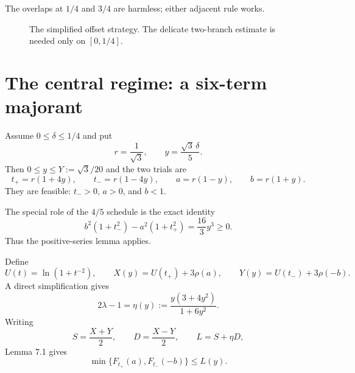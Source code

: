 \documentclass[11pt]{article}
\theoremstyle{definition}
\newcommand{\1}{\mathbf{1}}
\begin{document}
The overlaps at $1/4$ and $3/4$ are harmless; either adjacent rule works.

\begin{figure}[t]
\centering
{}
\caption{The simplified offset strategy.  The delicate two-branch estimate is needed only on $[0,1/4]$.}
\label{fig:regimes}
\end{figure}

\section{The central regime: a six-term majorant}

Assume $0\le\delta\le1/4$ and put
\begin{equation}
r=\frac1{\sqrt3},
\qquad
y=\frac{\sqrt3\,\delta}{5}.
\label{eq:y-def}
\end{equation}
Then $0\le y\le Y:=\sqrt3/20$ and the two trials are
\begin{equation}
 t_+=r(1+4y),\qquad t_-=r(1-4y),
\qquad a=r(1-y),\qquad b=r(1+y).
\label{eq:four-fifths}
\end{equation}
They are feasible: $t_->0$, $a>0$, and $b<1$.

The special role of the $4/5$ schedule is the exact identity
\begin{equation}
b^2(1+t_-^2)-a^2(1+t_+^2)=\frac{16}{3}y^3\ge0.
\label{eq:magic-cubic}
\end{equation}
Thus the positive-series lemma applies.

Define
\[
U(t)=\ln(1+t^{-2}),
\qquad
X(y)=U(t_+)+3\rho(a),
\qquad
Y(y)=U(t_-)+3\rho(-b).
\]
A direct simplification gives
\begin{equation}
2\lambda-1=\eta(y):=\frac{y(3+4y^2)}{1+6y^2}.
\label{eq:eta}
\end{equation}
Writing
\[
S=\frac{X+Y}{2},
\qquad
D=\frac{X-Y}{2},
\qquad
L=S+\eta D,
\]
Lemma 7.1 gives
\begin{equation}
\min\{F_{t_+}(a),F_{t_-}(-b)\}\le L(y).
\label{eq:min-L}
\end{equation}
\end{document}
